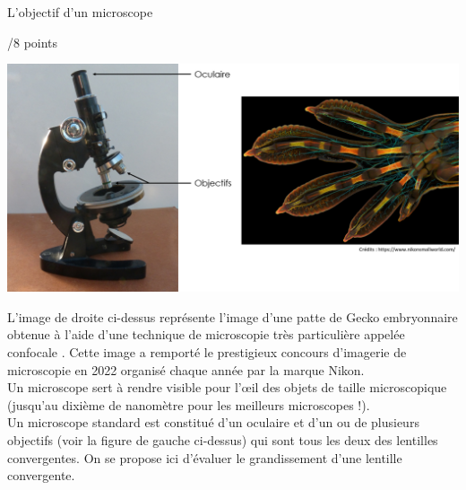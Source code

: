\begin{doc}{L'objectif d'un microscope \begin{Large}
    /8 points
\end{Large}}
\begin{center}
    \includegraphics[scale=0.4]{Images/Microscope.png}
\end{center}
      
L'image de droite ci-dessus représente l'image d'une patte de Gecko embryonnaire obtenue à l'aide d'une technique de microscopie très particulière appelée \og confocale \fg. Cette image a remporté le prestigieux concours d'imagerie de microscopie en 2022 organisé chaque année par la marque Nikon.\\
Un microscope sert à rendre visible pour l'\oe il des objets de taille microscopique (jusqu'au dixième de nanomètre pour les meilleurs microscopes !). \\
Un microscope standard est constitué d'un oculaire et d'un ou de plusieurs objectifs (voir la figure de gauche ci-dessus) qui sont tous les deux des lentilles convergentes. On se propose ici d'évaluer le grandissement d'une lentille convergente.


\end{doc}
